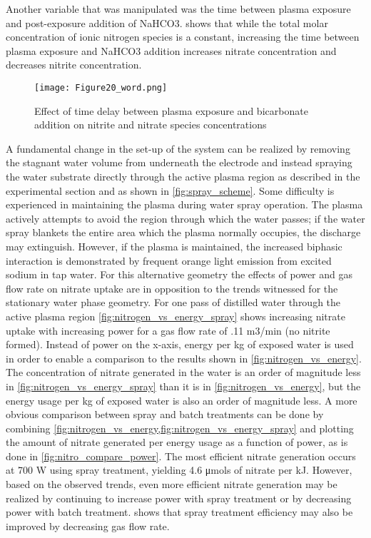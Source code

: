 Another variable that was manipulated was the time between plasma exposure and post-exposure addition of NaHCO3.  shows that while the total molar concentration of ionic nitrogen species is a constant, increasing the time between plasma exposure and NaHCO3 addition increases nitrate concentration and decreases nitrite concentration.

\begin{figure}[htbp]
  \centering
  \texttt{[image: Figure20\_word.png]}
  \caption{Effect of time delay between plasma exposure and bicarbonate addition on nitrite and nitrate species concentrations}
  \label{fig:nitrogen_vs_time_delay}
\end{figure}

A fundamental change in the set-up of the system can be realized by removing the stagnant water volume from underneath the electrode and instead spraying the water substrate directly through the active plasma region as described in the experimental section and as shown in \cref{fig:spray_scheme}.  Some difficulty is experienced in maintaining the plasma during water spray operation.  The plasma actively attempts to avoid the region through which the water passes; if the water spray blankets the entire area which the plasma normally occupies, the discharge may extinguish.  However, if the plasma is maintained, the increased biphasic interaction is demonstrated by frequent orange light emission from excited sodium in tap water.  For this alternative geometry the effects of power and gas flow rate on nitrate uptake are in opposition to the trends witnessed for the stationary water phase geometry.   For one pass of distilled water through the active plasma region \cref{fig:nitrogen_vs_energy_spray} shows increasing nitrate uptake with increasing power for a gas flow rate of .11 m3/min (no nitrite formed).  Instead of power on the x-axis, energy per kg of exposed water is used in order to enable a comparison to the results shown in \cref{fig:nitrogen_vs_energy}.  The concentration of nitrate generated in the water is an order of magnitude less in \cref{fig:nitrogen_vs_energy_spray} than it is in \cref{fig:nitrogen_vs_energy}, but the energy usage per kg of exposed water is also an order of magnitude less.  A more obvious comparison between spray and batch treatments can be done by combining \cref{fig:nitrogen_vs_energy,fig:nitrogen_vs_energy_spray} and plotting the amount of nitrate generated per energy usage as a function of power, as is done in \cref{fig:nitro_compare_power}.  The most efficient nitrate generation occurs at 700 W using spray treatment, yielding 4.6 μmols of nitrate per kJ.  However, based on the observed trends, even more efficient nitrate generation may be realized by continuing to increase power with spray treatment or by decreasing power with batch treatment.   shows that spray treatment efficiency may also be improved by decreasing gas flow rate.

